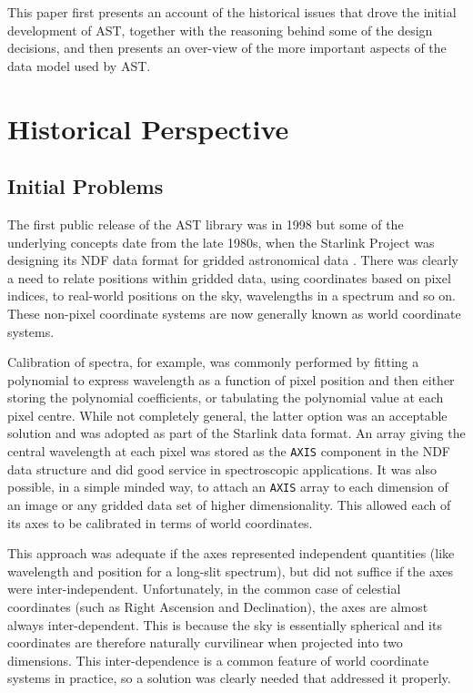 \documentclass[final,authoryear,5p,times,twocolumn]{elsarticle}
\begin{document}
This paper first presents an account of the historical issues that drove
the initial development of AST, together with the reasoning behind some
of the design decisions, and then presents an over-view of the more
important aspects of the data model used by AST.

\section{Historical Perspective}

\subsection{Initial Problems}

The first public release of the AST library was in 1998
\citep{1998StarB..20....6L,1998StarB..20....7D} but some of the
underlying concepts date from the late 1980s, when the Starlink
Project was designing its NDF data format for gridded astronomical
data \citep{2015Jenness}. There was clearly a need to relate positions
within gridded data, using coordinates based on pixel indices, to
real-world positions on the sky, wavelengths in a spectrum and so
on. These non-pixel coordinate systems are now generally known as
world coordinate systems.

Calibration of spectra, for example, was commonly performed by fitting
a polynomial to express wavelength as a function of pixel position and
then either storing the polynomial coefficients, or tabulating the
polynomial value at each pixel centre. While not completely general,
the latter option was an acceptable solution and was adopted as part
of the Starlink data format. An array giving the central wavelength at
each pixel was stored as the \texttt{AXIS} component in the NDF data
structure and did good service in spectroscopic applications. It was
also possible, in a simple minded way, to attach an \texttt{AXIS}
array to each dimension of an image or any gridded data set of higher
dimensionality. This allowed each of its axes to be calibrated in
terms of world coordinates.

This approach was adequate if the axes represented independent
quantities (like wavelength and position for a long-slit spectrum),
but did not suffice if the axes were inter-independent. Unfortunately,
in the common case of celestial coordinates (such as Right Ascension
and Declination), the axes are almost always inter-dependent. This is
because the sky is essentially spherical and its coordinates are
therefore naturally curvilinear when projected into two
dimensions. This inter-dependence is a common feature of world
coordinate systems in practice, so a solution was clearly needed that
addressed it properly.
\end{document}
